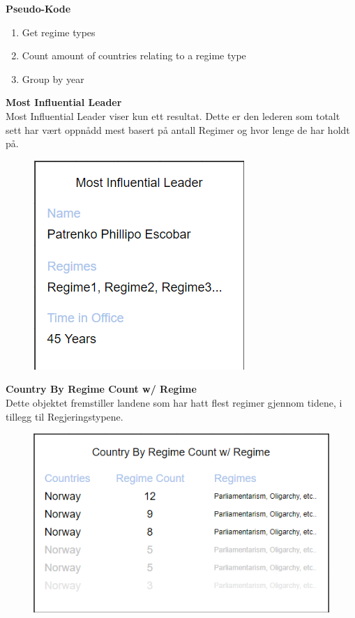 \textbf{Pseudo-Kode}
\begin{enumerate}
  \item Get regime types
  \item Count amount of countries relating to a regime type
  \item Group by year
\end{enumerate}

\textbf{Most Influential Leader}\\
Most Influential Leader viser kun ett resultat. Dette er den lederen som totalt sett har vært oppnådd 
mest basert på antall Regimer og hvor lenge de har holdt på.

\FigureCounter
\begin{figure}[H]
  \includegraphics[scale=0.75]{images/milepael4/mostInfluentialLeader.png}
\end{figure}

\textbf{Country By Regime Count w/ Regime}\\
Dette objektet fremstiller landene som har hatt flest regimer gjennom tidene, i tillegg til 
Regjeringstypene.

\FigureCounter
\begin{figure}[H]
  \includegraphics[scale=0.75]{images/milepael4/countryByRegimeCountWithRegime.png}
\end{figure}


